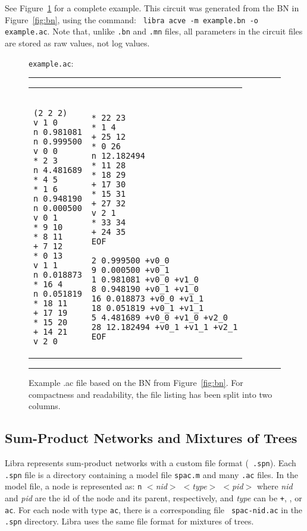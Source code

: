 \documentclass[11pt]{article}
\begin{document}
See Figure~\ref{fig:ac-txt} for a complete example.  This circuit was
generated from the BN in Figure~\ref{fig:bn}, using the command: {\tt
libra acve -m example.bn -o example.ac}.  Note that, unlike {\tt .bn}
and {\tt .mn} files, all parameters in the circuit files are stored as
raw values, not log values.

\begin{figure}[tb]
{\tt example.ac}:
\hrule
\begin{small}
\begin{tabular}{ll}
\begin{minipage}[t]{2.75in}
\begin{verbatim}

(2 2 2)
v 1 0
n 0.981081
n 0.999500
v 0 0
* 2 3
n 4.481689
* 4 5
* 1 6
n 0.948190
n 0.000500
v 0 1
* 9 10
* 8 11
+ 7 12
* 0 13
v 1 1
n 0.018873
* 16 4
n 0.051819
* 18 11
+ 17 19
* 15 20
+ 14 21
v 2 0

\end{verbatim}
\end{minipage}
&
\begin{minipage}[t]{2.75in}
\begin{verbatim}

* 22 23
* 1 4
+ 25 12
* 0 26
n 12.182494
* 11 28
* 18 29
+ 17 30
* 15 31
+ 27 32
v 2 1
* 33 34
+ 24 35
EOF

2 0.999500 +v0_0
9 0.000500 +v0_1
1 0.981081 +v0_0 +v1_0
8 0.948190 +v0_1 +v1_0
16 0.018873 +v0_0 +v1_1
18 0.051819 +v0_1 +v1_1
5 4.481689 +v0_0 +v1_0 +v2_0
28 12.182494 +v0_1 +v1_1 +v2_1
EOF
\end{verbatim}
\end{minipage}
\end{tabular}
\end{small}
\hrule
\caption{Example .ac file based on the BN from Figure~\ref{fig:bn}.
For compactness and readability, the file listing has been split
into two columns.}
\label{fig:ac-txt}
\end{figure}

\subsection{Sum-Product Networks and Mixtures of Trees}

Libra represents sum-product networks with a custom file format ({\tt
.spn}).  Each {\tt .spn} file is a directory containing a model file
{\tt spac.m} and many {\tt .ac} files. In the model file, a node is
represented as: {\tt n} {\em $<$nid$>$ $<$type$>$ $<$pid$>$} where
{\em nid} and {\em pid} are the id of the node and its parent,
respectively, and {\em type} can be {\tt +}, {\tt *}, or {\tt ac}.
For each node with type {\tt ac}, there is a corresponding file {\tt
spac-nid.ac} in the {\tt .spn} directory. Libra uses the same file
format for mixtures of trees.
\end{document}
